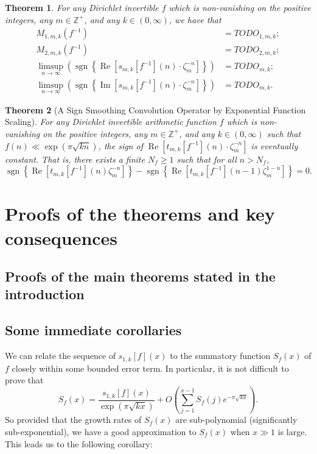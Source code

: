 \documentclass[11pt,reqno]{amsart}
\numberwithin{figure}{section}
\numberwithin{table}{section}
\DeclareMathOperator{\sgn}{sgn}
\renewcommand{\Re}{\operatorname{Re}}
\renewcommand{\Im}{\operatorname{Im}}
\theoremstyle{plain}
\newtheorem{theorem}{Theorem}
\numberwithin{theorem}{section}
\theoremstyle{definition}
\begin{document}
\begin{theorem} 
\label{theorem_Intro_InitBounds} 
For any Dirichlet invertible $f$ which is non-vanishing on the positive integers, 
any $m \in \mathbb{Z}^{+}$, and any $k \in (0, \infty)$, we have that 
\begin{align}
\tag{A} 
M_{1,m,k}(f^{-1}) & = TODO_{1,m,k}; \\ 
\tag{B} 
M_{2,m,k}(f^{-1}) & = TODO_{2,m,k}; \\ 
\tag{C} 
\limsup_{n \rightarrow \infty} \left(\sgn\left\{\Re\left[s_{m,k}[f^{-1}](n) \cdot \zeta_m^{-n}\right]\right\}\right) & = 
     TODO_{m,k}; \\ 
\tag{D} 
\limsup_{n \rightarrow \infty} \left(\sgn\left\{\Im\left[s_{m,k}[f^{-1}](n) \cdot \zeta_m^{-n}\right]\right\}\right) & = 
     TODO_{m,k}.
\end{align} 
\end{theorem}

\begin{theorem}[A Sign Smoothing Convolution Operator by Exponential Function Scaling] 
\label{theorem_MainTheorem_Stmt_v2} 
For any Dirichlet invertible arithmetic function $f$ which is non-vanishing on the positive integers, 
any $m \in \mathbb{Z}^{+}$, and any $k \in (0, \infty)$ such that 
$f(n) \ll \exp(\pi\sqrt{kn})$, the sign of 
$\Re\left[t_{m,k}[f^{-1}](n) \cdot \zeta_m^{-n}\right]$ is eventually constant. 
That is, there exists a finite $N_f \geq 1$ such that for all $n > N_f$, 
\[
\sgn\left\{\Re\left[t_{m,k}[f^{-1}](n) \zeta_m^{-n}\right]\right\} - 
     \sgn\left\{\Re\left[t_{m,k}[f^{-1}](n-1) \zeta_m^{1-n}\right]\right\} = 0. 
\]
\end{theorem} 

\section{Proofs of the theorems and key consequences} 

\subsection{Proofs of the main theorems stated in the introduction} 

\subsection{Some immediate corollaries} 

We can relate the sequence of $s_{1,k}[f](x)$ to the summatory function $S_f(x)$ of $f$ closely within 
some bounded error term. In particular, it is not difficult to prove that 
\[
S_f(x) = \frac{s_{1,k}[f](x)}{\exp(\pi\sqrt{kx})} + O\left(\sum_{j=1}^{x-1} S_f(j) e^{-\pi\sqrt{kx}}\right). 
\]
So provided that the growth rates of $S_f(x)$ are sub-polynomial (significantly sub-exponential), we have a good 
approximation to $S_f(x)$ when $x \gg 1$ is large. This leads us to the following corollary: 
\end{document}

